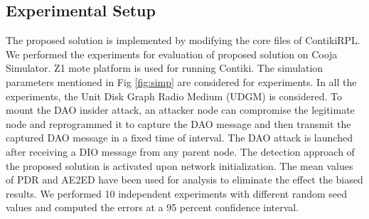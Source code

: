 \documentclass[conference, a4paper]{IEEEtran}
\begin{document}
 

        
    
  
 

\subsection{Experimental Setup}

The proposed solution is implemented by modifying the core files of ContikiRPL. We performed the experiments for evaluation of proposed solution on Cooja Simulator. Z1 mote platform is used for running Contiki. The simulation parameters mentioned in Fig \ref{fig:simp} are considered for experiments. In all the experiments, the Unit Disk Graph Radio Medium (UDGM) is considered. To mount the DAO insider attack, an attacker node can compromise the legitimate node and reprogrammed it to capture the DAO message and then transmit the captured DAO message in a fixed time of interval. The DAO attack is launched after receiving a DIO message from any parent node. The detection approach of the proposed solution is activated upon network initialization. The mean values of PDR and AE2ED have been used for analysis to eliminate the effect the biased results. We performed 10 independent experiments with different random seed values and computed the errors at a 95 percent confidence interval.
\end{document}
